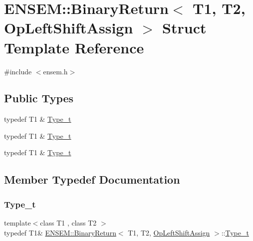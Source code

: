 \hypertarget{structENSEM_1_1BinaryReturn_3_01T1_00_01T2_00_01OpLeftShiftAssign_01_4}{}\section{E\+N\+S\+EM\+:\+:Binary\+Return$<$ T1, T2, Op\+Left\+Shift\+Assign $>$ Struct Template Reference}
\label{structENSEM_1_1BinaryReturn_3_01T1_00_01T2_00_01OpLeftShiftAssign_01_4}


{\ttfamily \#include $<$ensem.\+h$>$}

\subsection*{Public Types}
\begin{DoxyCompactItemize}
\item 
typedef T1 \& \mbox{\hyperlink{structENSEM_1_1BinaryReturn_3_01T1_00_01T2_00_01OpLeftShiftAssign_01_4_a86e3783b9979825629679e9fc7023298}{Type\+\_\+t}}
\item 
typedef T1 \& \mbox{\hyperlink{structENSEM_1_1BinaryReturn_3_01T1_00_01T2_00_01OpLeftShiftAssign_01_4_a86e3783b9979825629679e9fc7023298}{Type\+\_\+t}}
\item 
typedef T1 \& \mbox{\hyperlink{structENSEM_1_1BinaryReturn_3_01T1_00_01T2_00_01OpLeftShiftAssign_01_4_a86e3783b9979825629679e9fc7023298}{Type\+\_\+t}}
\end{DoxyCompactItemize}


\subsection{Member Typedef Documentation}
\mbox{\label{structENSEM_1_1BinaryReturn_3_01T1_00_01T2_00_01OpLeftShiftAssign_01_4_a86e3783b9979825629679e9fc7023298}} 
\subsubsection{\texorpdfstring{Type\_t}{Type\_t}\hspace{0.1cm}{\footnotesize\ttfamily [1/3]}}
{\footnotesize\ttfamily template$<$class T1 , class T2 $>$ \\
typedef T1\& \mbox{\hyperlink{structENSEM_1_1BinaryReturn}{E\+N\+S\+E\+M\+::\+Binary\+Return}}$<$ T1, T2, \mbox{\hyperlink{structENSEM_1_1OpLeftShiftAssign}{Op\+Left\+Shift\+Assign}} $>$\+::\mbox{\hyperlink{structENSEM_1_1BinaryReturn_3_01T1_00_01T2_00_01OpLeftShiftAssign_01_4_a86e3783b9979825629679e9fc7023298}{Type\+\_\+t}}}

